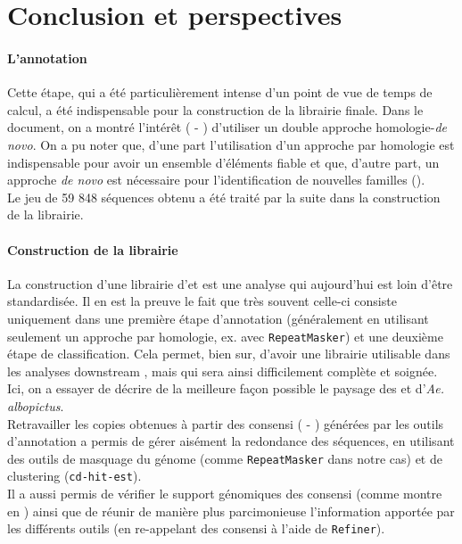 \documentclass[10pt]{article}
\begin{document}
\clearpage\newpage

\section{Conclusion et perspectives}\label{sec:concl}

\paragraph{L'annotation} Cette étape, qui a été particulièrement intense d'un point de vue de temps de calcul, a été indispensable pour la construction de la librairie finale. Dans le document, on a montré l'intérêt (\subsectionautorefname{ \ref{sec:clustering_and_refining}} - \textsc{}) d'utiliser un double approche homologie-\textit{de novo}. On a pu noter que, d'une part l'utilisation d'un approche par homologie est indispensable pour avoir un ensemble d'éléments fiable et que, d'autre part, un approche \textit{de novo} est nécessaire pour l'identification de nouvelles familles (\figureautorefname{ \ref{fig:contribution}}). \\
Le jeu de 59 848 séquences obtenu a été traité par la suite dans la construction de la librairie. \\


\paragraph{Construction de la librairie} La construction d'une librairie d'\acrshort{et} est une analyse qui aujourd'hui est loin d'être standardisée. Il en est la preuve le fait que très souvent celle-ci consiste uniquement dans une première étape d'annotation (généralement en utilisant seulement un approche par homologie, ex. avec \texttt{RepeatMasker}) et une deuxième étape de classification. Cela permet, bien sur, d'avoir une librairie utilisable dans les analyses \og downstream \fg{}, mais qui sera ainsi difficilement complète et soignée. Ici, on a essayer de décrire de la meilleure façon possible le paysage des \acrlong{et} d'\textit{Ae. albopictus}. \\
Retravailler les copies obtenues à partir des consensi (\subsectionautorefname{ \ref{get_copies}} - \textsc{}) générées par les outils d'annotation a permis de gérer aisément la redondance des séquences, en utilisant des outils de masquage du génome (comme \texttt{RepeatMasker} dans notre cas) et de clustering (\texttt{cd-hit-est}). \\
Il a aussi permis de vérifier le support génomiques des consensi (comme montre en \tableautorefname{ \ref{tab:nb_not_matching_tab}}) ainsi que de réunir de manière plus parcimonieuse l'information apportée par les différents outils (en re-appelant des consensi à l'aide de \texttt{Refiner}). \\
\end{document}
